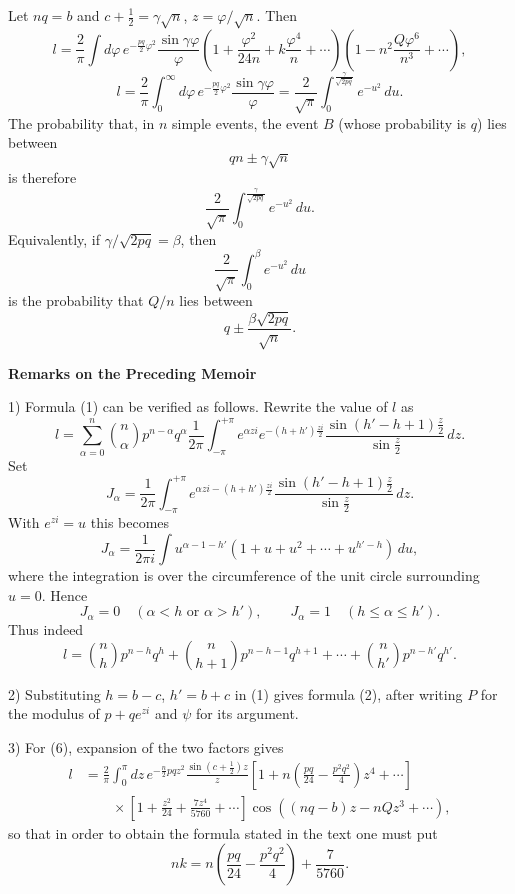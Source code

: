 \documentclass[11pt]{article}
\begin{document}
Let $nq=b$ and $c+\frac12=\gamma\sqrt n$, $z=\varphi/\sqrt n$. Then
\begin{equation}
 l=\frac2\pi\int d\varphi\,e^{-\frac{pq}{2}\varphi^2}\frac{\sin\gamma\varphi}{\varphi}\left(1+\frac{\varphi^2}{24n}+k\frac{\varphi^4}{n}+\cdots\right)\left(1-n^2\frac{Q\varphi^6}{n^3}+\cdots\right),
\tag{7}
\end{equation}
\begin{equation}
 l=\frac2\pi\int_0^\infty d\varphi\,e^{-\frac{pq}{2}\varphi^2}\frac{\sin\gamma\varphi}{\varphi}
 =\frac2{\sqrt\pi}\int_0^{\frac{\gamma}{\sqrt{2pq}}}e^{-u^2}\,du.
\tag{8}
\end{equation}
The probability that, in $n$ simple events, the event $B$ (whose probability is $q$) lies between
\[
 qn\pm\gamma\sqrt n
\]
is therefore
\[
 \frac2{\sqrt\pi}\int_0^{\frac{\gamma}{\sqrt{2pq}}}e^{-u^2}\,du.
\]
Equivalently, if $\gamma/\sqrt{2pq}=\beta$, then
\[
 \frac2{\sqrt\pi}\int_0^\beta e^{-u^2}\,du
\]
is the probability that $Q/n$ lies between
\[
 q\pm\frac{\beta\sqrt{2pq}}{\sqrt n}.
\]

\begin{center}\large\bfseries Remarks on the Preceding Memoir\end{center}

1) Formula (1) can be verified as follows. Rewrite the value of $l$ as
\[
 l=\sum_{\alpha=0}^n \binom n\alpha p^{n-\alpha}q^\alpha\frac{1}{2\pi}\int_{-\pi}^{+\pi}e^{\alpha zi}e^{-(h+h')\frac{zi}{2}}\frac{\sin(h'-h+1)\frac z2}{\sin\frac z2}\,dz.
\]
Set
\[
 J_\alpha=\frac{1}{2\pi}\int_{-\pi}^{+\pi}e^{\alpha zi-(h+h')\frac{zi}{2}}\frac{\sin(h'-h+1)\frac z2}{\sin\frac z2}\,dz.
\]
With $e^{zi}=u$ this becomes
\[
 J_\alpha=\frac{1}{2\pi i}\int u^{\alpha-1-h'}(1+u+u^2+\cdots+u^{h'-h})\,du,
\]
where the integration is over the circumference of the unit circle surrounding $u=0$. Hence
\[
 J_\alpha=0\quad(\alpha<h\text{ or }\alpha>h'),\qquad
 J_\alpha=1\quad(h\le\alpha\le h').
\]
Thus indeed
\[
 l=\binom nh p^{n-h}q^h+\binom n{h+1}p^{n-h-1}q^{h+1}+\cdots+\binom n{h'}p^{n-h'}q^{h'}.
\]

2) Substituting $h=b-c$, $h'=b+c$ in (1) gives formula (2), after writing $P$ for the modulus of $p+qe^{zi}$ and $\psi$ for its argument.

3) For (6), expansion of the two factors gives
\[
\begin{aligned}
 l&=\frac2\pi\int_0^\pi dz\,e^{-\frac n2pqz^2}\frac{\sin(c+\frac12)z}{z}
 \left[1+n\left(\frac{pq}{24}-\frac{p^2q^2}{4}\right)z^4+\cdots\right]\\
&\qquad\times\left[1+\frac{z^2}{24}+\frac{7z^4}{5760}+\cdots\right]
 \cos((nq-b)z-nQz^3+\cdots),
\end{aligned}
\]
so that in order to obtain the formula stated in the text one must put
\[
 nk=n\left(\frac{pq}{24}-\frac{p^2q^2}{4}\right)+\frac7{5760}.
\]
\end{document}
